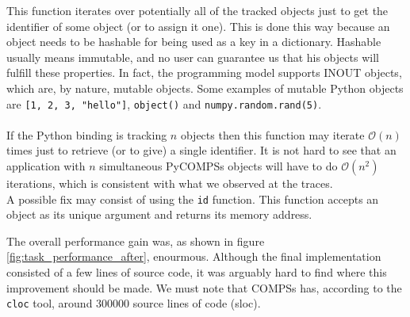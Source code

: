 This function iterates over potentially all of the tracked objects just to get the identifier of some object (or to assign it one). This is done this way because an object needs to be hashable for being used as a key in a dictionary. Hashable usually means immutable, and no user can guarantee us that his objects will fulfill these properties. In fact, the programming model supports INOUT objects, which are, by nature, mutable objects. Some examples of mutable Python objects are \verb|[1, 2, 3, "hello"]|, \verb|object()| and \verb|numpy.random.rand(5)|.\\
\\
If the Python binding is tracking $n$ objects then this function may iterate $\mathcal{O}(n)$ times just to retrieve (or to give) a single identifier. It is not hard to see that an application with $n$ simultaneous PyCOMPSs objects will have to do $\mathcal{O}(n^2)$ iterations, which is consistent with what we observed at the traces.
\\
A possible fix may consist of using the \verb|id| function. This function accepts an object as its unique argument and returns its memory address.

The overall performance gain was, as shown in figure \ref{fig:task_performance_after}, enourmous. Although the final implementation consisted of a few lines of source code, it was arguably hard to find where this improvement should be made. We must note that COMPSs has, according to the \verb|cloc| tool, around 300000 source lines of code (sloc).
